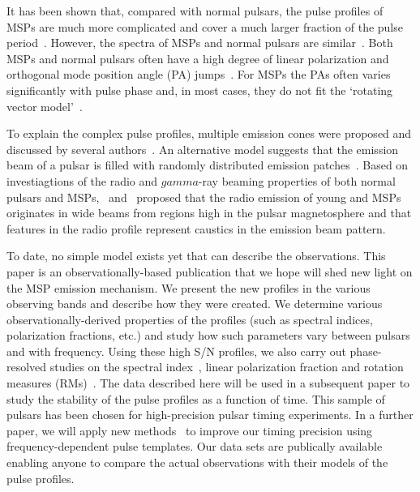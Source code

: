 \documentclass[useAMS,usenatbib]{mn2e}
\begin{document}
It has been shown that, compared with normal pulsars, the pulse profiles of MSPs are 
much more complicated and cover a much larger fraction of the pulse period~\citep{Yan11}. 
%
However, the spectra of MSPs and normal pulsars are similar~\citep{Toscano98,Kramer98,Kramer99}.
%
Both MSPs and normal pulsars often have a high degree of linear polarization and orthogonal 
mode position angle (PA) jumps~\citep[see e.g.,][]{Thorsett90,Navarro97,Stairs99,Manchester04,Ord04}.
%
For MSPs the PAs often varies significantly with pulse phase and, in most cases, they do not fit 
the `rotating vector model'~\citep[RVM,][]{Radhakrishnan69}.

To explain the complex pulse profiles, multiple emission cones were proposed 
and discussed by several authors~\citep{Rankin93,Kramer94b,Gupta03}. An alternative 
model suggests that the emission beam of a pulsar is filled with randomly 
distributed emission patches~\citep{Lyne88,Manchester95_2,Han01}. 
%
Based on investiagtions of the radio and $gamma$-ray beaming properties of both normal 
pulsars and MSPs,~\citet{Manchester05b} and~\citet{Ravi10} proposed that the radio emission 
of young and MSPs originates in wide beams from regions high in the pulsar magnetosphere 
and that features in the radio profile represent caustics in the emission beam pattern.
%

To date, no simple model exists yet that can describe the observations.  
%
This paper is an observationally-based publication that we hope will shed new 
light on the MSP emission mechanism.  
%
We present the new profiles in the various observing bands and describe how they were 
created. We determine various observationally-derived properties of the profiles (such as 
spectral indices, polarization fractions, etc.) and study how such parameters vary 
between pulsars and with frequency. 
%
Using these high S/N profiles, we also carry out phase-resolved studies on 
the spectral index~\citep[e.g.,][]{Lyne88,Kramer94a,Chen07}, linear polarization 
fraction and rotation measures (RMs)~\citep[e.g.,][]{Noutsos09}.
%
The data described here will be used in a subsequent paper to study the stability 
of the pulse profiles as a function of time. This sample of pulsars has been chosen for 
high-precision pulsar timing experiments. In a further paper, we will apply 
new methods~\citep[e.g.,][]{Pennucci14,Liu14} to improve our timing precision using 
frequency-dependent pulse templates.  
%
Our data sets are publically available enabling anyone to compare the actual 
observations with their models of the pulse profiles.
%
\end{document}
